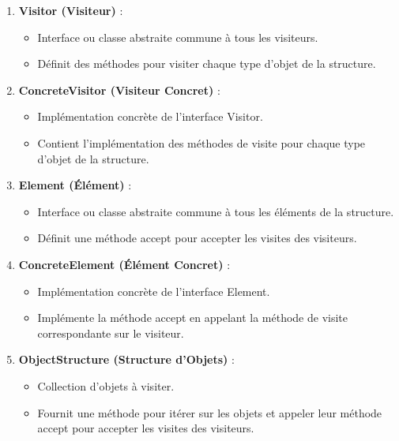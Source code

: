\begin{enumerate}[leftmargin=*,labelsep=3mm]
    \item \textbf{Visitor (Visiteur)} :
    \begin{itemize}
        \item Interface ou classe abstraite commune à tous les visiteurs.
        \item Définit des méthodes pour visiter chaque type d'objet de la structure.
    \end{itemize}
    
    \item \textbf{ConcreteVisitor (Visiteur Concret)} :
    \begin{itemize}
        \item Implémentation concrète de l'interface Visitor.
        \item Contient l'implémentation des méthodes de visite pour chaque type d'objet de la structure.
    \end{itemize}
    
    \item \textbf{Element (Élément)} :
    \begin{itemize}
        \item Interface ou classe abstraite commune à tous les éléments de la structure.
        \item Définit une méthode accept pour accepter les visites des visiteurs.
    \end{itemize}
    
    \item \textbf{ConcreteElement (Élément Concret)} :
    \begin{itemize}
        \item Implémentation concrète de l'interface Element.
        \item Implémente la méthode accept en appelant la méthode de visite correspondante sur le visiteur.
    \end{itemize}
    
    \item \textbf{ObjectStructure (Structure d'Objets)} :
    \begin{itemize}
        \item Collection d'objets à visiter.
        \item Fournit une méthode pour itérer sur les objets et appeler leur méthode accept pour accepter les visites des visiteurs.
    \end{itemize}
\end{enumerate}

